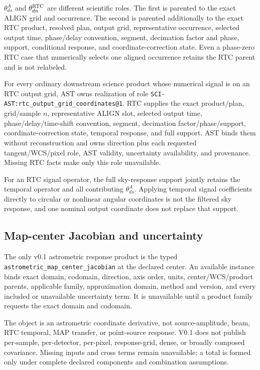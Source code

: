 $\theta^A_{ds}$ and $\theta^{\rm RTC}_{dn}$ are different scientific roles.
The first is parented to the exact ALIGN grid and occurrence.  The second is
parented additionally to the exact RTC product, resolved plan, output grid,
representative occurrence, selected output time, phase/delay convention,
segment, decimation factor and phase, support, conditional response, and
coordinate-correction state.  Even a phase-zero RTC case that numerically
selects one aligned occurrence retains the RTC parent and is not relabeled.

For every ordinary downstream science product whose numerical signal is on an
RTC output grid, AST owns realization of role
\texttt{SCI-AST:rtc\_output\_grid\_coordinates@1}. RTC supplies the exact
product/plan, grid/sample \(n\), representative ALIGN slot, selected output
time, phase/delay/time-shift convention, segment, decimation
factor/phase/support, coordinate-correction state, temporal response, and full
support. AST binds them without reconstruction and owns direction plus each
requested tangent/WCS/pixel role, AST validity, uncertainty availability, and
provenance. Missing RTC facts make only this role unavailable.

For an RTC signal operator, the full sky-response support jointly retains the
temporal operator and all contributing $\theta^A_{ds}$.  Applying temporal
signal coefficients directly to circular or nonlinear angular coordinates is
not the filtered sky response, and one nominal output coordinate does not
replace that support.

\subsection{Map-center Jacobian and uncertainty}

The only v0.1 astrometric response product is the typed
\texttt{astrometric\_map\_center\_jacobian} at the declared center.  An
available instance binds exact domain, codomain, direction, axis order, units,
center/WCS/product parents, applicable family, approximation domain, method
and version, and every included or unavailable uncertainty term.  It is
unavailable until a product family requests the exact domain and codomain.

The object is an astrometric coordinate derivative, not source-amplitude,
beam, RTC temporal, MAP transfer, or point-source response.  V0.1 does not
publish per-sample, per-detector, per-pixel, response-grid, dense, or broadly
composed covariance.  Missing inputs and cross terms remain unavailable; a
total is formed only under complete declared components and combination
assumptions.

